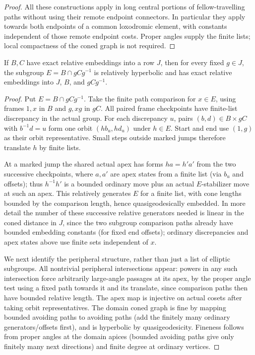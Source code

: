 \begin{proof}
All these constructions apply in long central portions of
fellow-travelling paths without using their remote endpoint
connectors. In particular they apply towards both endpoints of a
common loxodromic element, with constants independent of those
remote endpoint costs. Proper angles supply the finite lists;
local compactness of the coned graph is not required.
\end{proof}

\begin{lemma}\label{transfer:intersection}
If \(B,C\) have exact relative embeddings into a row \(J\), then for every fixed \(g\in J\), the subgroup \(E=B\cap gCg^{-1}\) is relatively hyperbolic and has exact relative embeddings into \(J\), \(B\), and \(gCg^{-1}\).
\end{lemma}
\begin{proof}
Put \(E=B\cap gCg^{-1}\). Take the finite path comparison for \(x\in E\), using frames \(1,x\) in \(B\) and \(g,xg\) in \(gC\). All paired frame checkpoints have finite-list discrepancy in the actual group. For each discrepancy \(u\), pairs \((b,d)\in B\times gC\) with \(b^{-1}d=u\) form one orbit \((h b_u,h d_u)\) under \(h\in E\). Start and end use \((1,g)\) as their orbit representative. Small steps outside marked jumps therefore translate \(h\) by finite lists.

At a marked jump the shared actual apex has forms \(h a=h' a'\) from the two successive checkpoints, where \(a,a'\) are apex states from a finite list (via \(b_u\) and offsets); thus \(h^{-1}h'\) is a bounded ordinary move plus an actual \(E\)-stabilizer move at such an apex. This relatively generates \(E\) for a finite list, with cone lengths bounded by the comparison length, hence quasigeodesically embedded. In more detail the number of these successive relative generators needed is linear in the coned distance in \(J\), since the two subgroup comparison paths already have bounded embedding constants (for fixed end offsets); ordinary discrepancies and apex states above use finite sets independent of \(x\).

We next identify the peripheral structure, rather than just a list
of elliptic subgroups. All nontrivial peripheral intersections appear: powers in any such intersection force arbitrarily large-angle passages at its apex, by the proper angle test using a fixed path towards it and its translate, since comparison paths then have bounded relative length. The apex map is injective on actual cosets after taking orbit representatives. The domain coned graph is fine by mapping bounded avoiding paths to avoiding paths (add the finitely many ordinary generators/offsets first), and is hyperbolic by quasigeodesicity. Fineness follows from proper angles at the domain apices (bounded avoiding paths give only finitely many next directions) and finite degree at ordinary vertices.


\end{proof}
